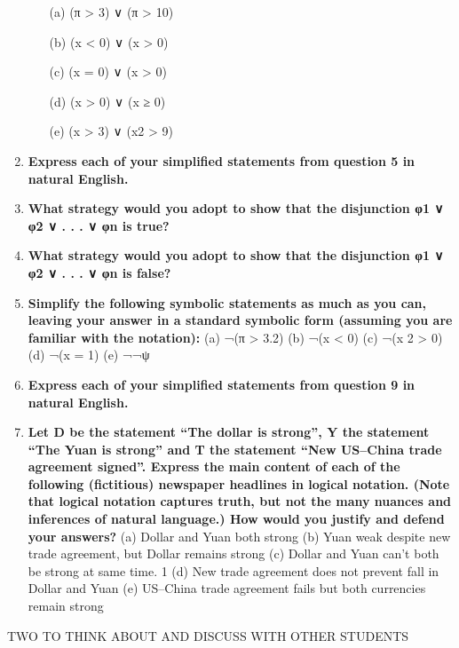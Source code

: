 \documentclass[12pt, letterpaper]{article}
\begin{document}
\begin{enumerate}
\begin{enumerate}
\item[(a)] (π > 3) ∨ (π > 10)
\item[(b)] (x < 0) ∨ (x > 0)
\item[(c)] (x = 0) ∨ (x > 0)
\item[(d)] (x > 0) ∨ (x ≥ 0)
\item[(e)] (x > 3) ∨ (x2 > 9)
\end{enumerate}
\item \textbf{Express each of your simplified statements from question 5 in natural English.}
\item \textbf{What strategy would you adopt to show that the disjunction φ1 ∨ φ2 ∨ . . . ∨ φn is true?}
\item \textbf{What strategy would you adopt to show that the disjunction φ1 ∨ φ2 ∨ . . . ∨ φn is false?}
\item \textbf{Simplify the following symbolic statements as much as you can, leaving your answer in a standard
symbolic form (assuming you are familiar with the notation):}
(a) ¬(π > 3.2)
(b) ¬(x < 0)
(c) ¬(x
2 > 0)
(d) ¬(x = 1)
(e) ¬¬ψ
\item \textbf{Express each of your simplified statements from question 9 in natural English.}
\item \textbf{Let D be the statement “The dollar is strong”, Y the statement “The Yuan is strong” and T
the statement “New US–China trade agreement signed”. Express the main content of each of the
following (fictitious) newspaper headlines in logical notation. (Note that logical notation captures
truth, but not the many nuances and inferences of natural language.) How would you justify and
defend your answers?}
(a) Dollar and Yuan both strong
(b) Yuan weak despite new trade agreement, but Dollar remains strong
(c) Dollar and Yuan can’t both be strong at same time.
1
(d) New trade agreement does not prevent fall in Dollar and Yuan
(e) US–China trade agreement fails but both currencies remain strong
\end{enumerate}
TWO TO THINK ABOUT AND DISCUSS WITH OTHER STUDENTS
\end{document}
